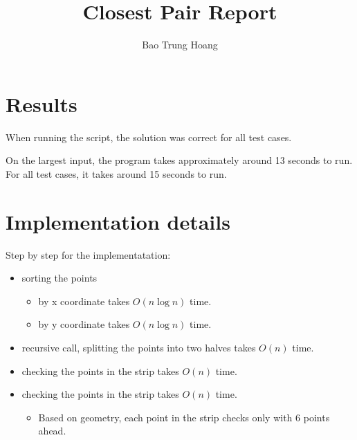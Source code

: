 \documentclass{article}
\title{Closest Pair Report}
\author{Bao Trung Hoang}
\begin{document}
  \maketitle

  \section{Results}


  When running the script, the solution was correct for all test cases.

  On the largest input, the program takes approximately around 13 seconds to run. 
  For all test cases, it takes around 15 seconds to run.



  \section{Implementation details}


  Step by step for the implementatation: 
  \begin{itemize}
    \item sorting the points 
    \begin{itemize}
      \item by x coordinate takes $O(n \log n)$ time.
      \item by y coordinate takes $O(n \log n)$ time.
    \end{itemize}
    \item recursive call, splitting the points into two halves takes $O(n)$ time.
    \item checking the points in the strip takes $O(n)$ time.
    \item checking the points in the strip takes $O(n)$ time.
    \begin{itemize}
      \item Based on geometry, each point in the strip checks only with 6 points ahead.
    \end{itemize}
  \end{itemize}
\end{document}
